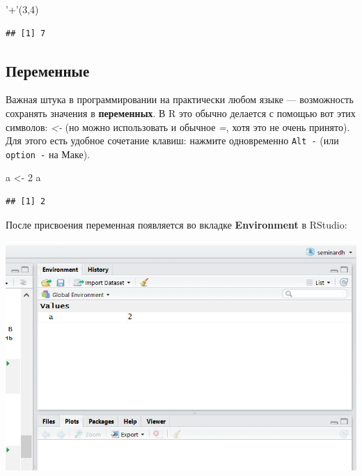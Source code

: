 \documentclass[]{book}
\newenvironment{Shaded}{\begin{snugshade}}{\end{snugshade}}
\newcommand{\DecValTok}[1]{\textcolor[rgb]{0.00,0.00,0.81}{#1}}
\newcommand{\NormalTok}[1]{#1}
\newcommand{\StringTok}[1]{\textcolor[rgb]{0.31,0.60,0.02}{#1}}
\begin{document}
\begin{Shaded}
\begin{Highlighting}[]
\StringTok{'+'}\NormalTok{(}\DecValTok{3}\NormalTok{,}\DecValTok{4}\NormalTok{)}
\end{Highlighting}
\end{Shaded}

\begin{verbatim}
## [1] 7
\end{verbatim}

\hypertarget{variables}{%
\subsection{Переменные}\label{variables}}

Важная штука в программировании на практически любом языке --- возможность сохранять значения в \textbf{переменных}. В R это обычно делается с помощью вот этих символов: \emph{\textless-} (но можно использовать и обычное \emph{=}, хотя это не очень принято). Для этого есть удобное сочетание клавиш: нажмите одновременно \texttt{Alt\ -} (или \texttt{option\ -} на Маке).

\begin{Shaded}
\begin{Highlighting}[]
\NormalTok{a <-}\StringTok{ }\DecValTok{2}
\NormalTok{a}
\end{Highlighting}
\end{Shaded}

\begin{verbatim}
## [1] 2
\end{verbatim}

После присвоения переменная появляется во вкладке \textbf{Environment} в RStudio:

\includegraphics{images/env.png}
\end{document}
